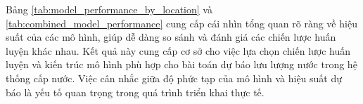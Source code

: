 Bảng \ref{tab:model_performance_by_location} và \ref{tab:combined_model_performance} cung cấp cái nhìn tổng quan rõ ràng về hiệu suất của các mô hình, giúp dễ dàng so sánh và đánh giá các chiến lược huấn luyện khác nhau. Kết quả này cung cấp cơ sở cho việc lựa chọn chiến lược huấn luyện và kiến trúc mô hình phù hợp cho bài toán dự báo lưu lượng nước trong hệ thống cấp nước. Việc cân nhắc giữa độ phức tạp của mô hình và hiệu suất dự báo là yếu tố quan trọng trong quá trình triển khai thực tế.
